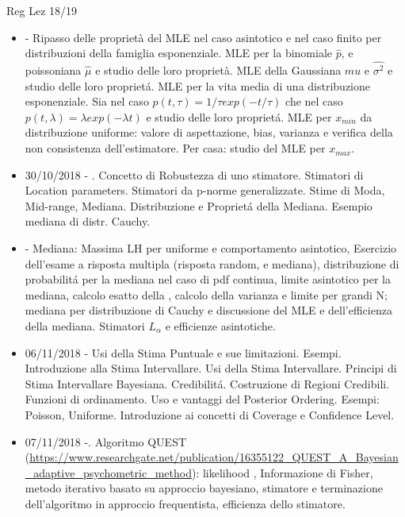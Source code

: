\begin{frame}[allowframebreaks]{Reg Lez 18/19}
\begin{itemize}
    \item {} - Ripasso delle proprietà del MLE nel caso asintotico e nel caso finito per distribuzioni della famiglia esponenziale. MLE per la binomiale $\hat{p}$, e poissoniana $\hat{\mu}$ e studio delle loro proprietà. MLE della Gaussiana $\hat{mu}$ e $\hat{\sigma^2}$ e studio delle loro propriet\'a. MLE per la vita media di una distribuzione esponenziale. Sia nel caso $p(t,\tau)=1/\tau exp(-t/\tau)$ che nel caso $p(t,\lambda)=\lambda exp(-\lambda t)$ e studio delle loro propriet\'a. MLE per $x_{min}$ da distribuzione uniforme: valore di aspettazione, bias, varianza e verifica della non consistenza dell'estimatore. Per casa: studio del MLE per $x_{max}$.
    
    \item 30/10/2018 - . Concetto di Robustezza di uno stimatore. Stimatori di Location parameters. Stimatori da p-norme generalizzate. Stime di Moda, Mid-range, Mediana. Distribuzione e Propriet\'a della Mediana. Esempio mediana di distr. Cauchy.
    
    \item {} - Mediana: Massima LH per uniforme e comportamento asintotico, Esercizio dell'esame a risposta multipla (risposta random, e mediana), distribuzione di probabilit\'a per la mediana nel caso di pdf continua, limite asintotico per la mediana, calcolo esatto della , calcolo della varianza e limite per grandi N; mediana per distribuzione di Cauchy e discussione del MLE e dell'efficienza della mediana. Stimatori $L_{\alpha}$ e efficienze asintotiche.
    
    \item 06/11/2018 - Usi della Stima Puntuale e sue limitazioni. Esempi. Introduzione alla Stima Intervallare. Usi della Stima Intervallare. Principi di Stima Intervallare Bayesiana. Credibilit\'a. Costruzione di Regioni Credibili. Funzioni di ordinamento. Uso e vantaggi del Posterior Ordering. Esempi: Poisson, Uniforme. Introduzione ai concetti di Coverage e Confidence Level.
    
    \item 07/11/2018 -. Algoritmo QUEST (\url{https://www.researchgate.net/publication/16355122_QUEST_A_Bayesian_adaptive_psychometric_method}): likelihood , Informazione di Fisher, metodo iterativo basato su approccio bayesiano, stimatore e terminazione dell'algoritmo in approccio frequentista, efficienza dello stimatore.
    

\end{itemize}
\end{frame}
